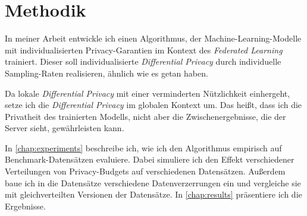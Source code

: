 \chapter{Methodik}\label{chap:methods}

	

In meiner Arbeit entwickle ich einen Algorithmus, der Machine-Learning-Modelle mit individualisierten Privacy-Garantien im Kontext des \textit{Federated Learning} trainiert. Dieser soll individualisierte \textit{Differential Privacy} durch individuelle Sampling-Raten realisieren, ähnlich wie es \textcite{jorgensen:2015, boenisch:2023} getan haben.

Da lokale \textit{Differential Privacy} mit einer verminderten Nützlichkeit einhergeht, setze ich die \textit{Differential Privacy} im globalen Kontext um. Das heißt, dass ich die Privatheit des trainierten Modells, nicht aber die Zwischenergebnisse, die der Server sieht, gewährleisten kann.

In \autoref{chap:experiments} beschreibe ich, wie ich den Algorithmus empirisch auf Benchmark-Datensätzen evaluiere. Dabei simuliere ich den Effekt verschiedener Verteilungen von Privacy-Budgets auf verschiedenen Datensätzen. Außerdem baue ich in die Datensätze verschiedene Datenverzerrungen ein und vergleiche sie mit gleichverteilten Versionen der Datensätze. In \autoref{chap:results} präsentiere ich die Ergebnisse.

